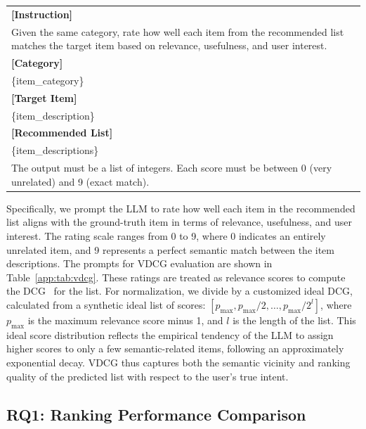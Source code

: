 \begin{promptbox}
\small
\begin{tabularx}{\linewidth}{X}
\toprule
\textbf{[Instruction]}\\
Given the same category, rate how well each item from the recommended list matches the target item based on relevance, usefulness, and user interest.\\[0.4em]
\textbf{[Category]}\\
\{item\_category\}\\[0.4em]
\textbf{[Target Item]}\\
\{item\_description\}\\[0.4em]
\textbf{[Recommended List]}\\
\{item\_descriptions\}\\[0.4em]
The output must be a list of integers. Each score must be between 0 (very unrelated) and 9 (exact match).\\
\bottomrule
\end{tabularx}
\end{promptbox}
\label{app:tab:vdcg}

Specifically, we prompt the LLM to rate how well each item in the recommended list aligns with the ground-truth item in terms of relevance, usefulness, and user interest. The rating scale ranges from 0 to 9, where 0 indicates an entirely unrelated item, and 9 represents a perfect semantic match between the item descriptions. The prompts for VDCG evaluation are shown in Table~\ref{app:tab:vdcg}.
These ratings are treated as relevance scores to compute the DCG~\cite{dcg} for the list. For normalization, we divide by a customized ideal DCG, calculated from a synthetic ideal list of scores: $[p_{\max}, p_{\max}/2, \dots, p_{\max}/2^{l}]$, where $p_{\max}$ is the maximum relevance score minus 1, and
$l$ is the length of the list. This ideal score distribution reflects the empirical tendency of the LLM to assign higher scores to only a few semantic-related items, following an approximately exponential decay. VDCG thus captures both the semantic vicinity and ranking quality of the predicted list with respect to the user's true intent.

\subsection{RQ1: Ranking Performance Comparison}

